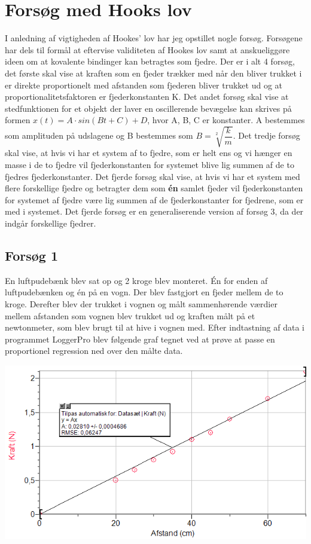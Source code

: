 \section{Forsøg med Hooks lov}
I anledning af vigtigheden af Hookes' lov har jeg opstillet nogle forsøg. Forsøgene har dels til formål at eftervise validiteten af Hookes lov samt at anskueliggøre ideen om at kovalente bindinger kan betragtes som fjedre. Der er i alt 4 forsøg, det første skal vise at kraften som en fjeder trækker med når den bliver trukket i er direkte proportionelt med afstanden som fjederen bliver trukket ud og at proportionalitetsfaktoren er fjederkonstanten K. Det andet forsøg skal vise at stedfunktionen for et objekt der laver en oscillerende bevægelse kan skrives på formen $x(t) = A \cdot sin(B t + C) + D$, hvor A, B, C er konstanter. A bestemmes som amplituden på udslagene og B bestemmes som $B=\sqrt[2]{\dfrac{k}{m}}$. Det tredje forsøg skal vise, at hvis vi har et system af to fjedre, som er helt ens og vi hænger en masse i de to fjedre vil fjederkonstanten for systemet blive lig summen af de to fjedres fjederkonstanter. Det fjerde forsøg skal vise, at hvis vi har et system med flere forskellige fjedre og betragter dem som \textbf{én} samlet fjeder vil fjederkonstanten for systemet af fjedre være lig summen af de fjederkonstanter for fjedrene, som er med i systemet. Det fjerde forsøg er en generaliserende version af forsøg 3, da der indgår forskellige fjedrer. 

\subsection{Forsøg 1}
En luftpudebænk blev sat op og 2 kroge blev monteret. Én for enden af luftpudebænken og én på en vogn. Der blev fastgjort en fjeder mellem de to kroge. Derefter blev der trukket i vognen og målt sammenhørende værdier mellem afstanden som vognen blev trukket ud og kraften målt på et newtonmeter, som blev brugt til at hive i vognen med. Efter indtastning af data i programmet LoggerPro blev følgende graf tegnet ved at prøve at passe en proportionel regression ned over den målte data. 

\begin{center}
\includegraphics[scale=0.7]{Billeder/graf1}
\end{center}

